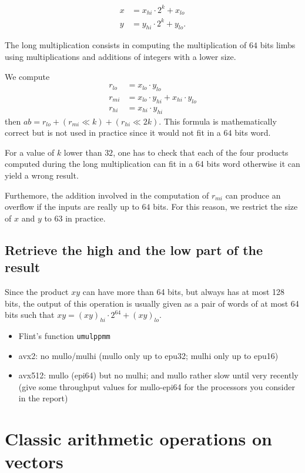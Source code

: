 \documentclass[a4paper]{article}
\begin{document}
\begin{align*}
    x &= x_{hi}\cdot 2^{k} + x_{lo} \\
    y &= y_{hi}\cdot 2^{k} + y_{lo}.
\end{align*}

The long multiplication consists in computing the multiplication of $64$ bits limbs using multiplications and additions of
integers with a lower size.

We compute
\begin{align*}
    r_{lo} &= x_{lo}\cdot y_{lo} \\
    r_{mi} &= x_{lo}\cdot y_{hi} + x_{hi}\cdot y_{lo} \\
    r_{hi} &= x_{hi}\cdot y_{hi}
\end{align*}
then $ab = r_{lo} + (r_{mi} \ll k) + (r_{hi} \ll 2k)$. This formula is mathematically correct but is not used in practice
since it would not fit in a $64$ bits word. 

For a value of $k$ lower than $32$, one has to check that each of the four products computed during the long multiplication can fit in a
64 bits word otherwise it can yield a wrong result.

Furthemore, the addition involved in the computation of $r_{mi}$ can produce an overflow if the inputs are really up to $64$ bits.
For this reason, we restrict the size of $x$ and $y$ to $63$ in practice. 

\subsection{Retrieve the high and the low part of the result}

Since the product $xy$ can have more than 64 bits, but always has at most 128 bits, the output of this operation is usually given as a pair of words of at most 64 
bits such that $xy = (xy)_{hi}\cdot 2^{64} + (xy)_{lo}$.

\begin{itemize}
    \item Flint's function \texttt{umulppmm}
    \item avx2: no mullo/mulhi (mullo only up to epu32; mulhi only up to epu16)
    \item avx512: mullo (epi64) but no mulhi; and mullo rather slow until very recently (give some throughput values for mullo-epi64 for the processors you consider in the report)
\end{itemize} 

\section{Classic arithmetic operations on vectors}
\end{document}
